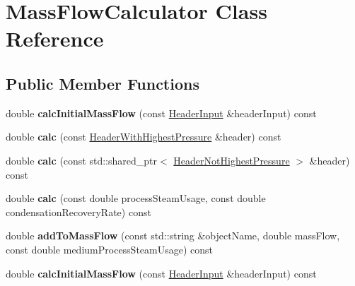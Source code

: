 \hypertarget{class_mass_flow_calculator}{}\section{Mass\+Flow\+Calculator Class Reference}
\label{class_mass_flow_calculator}
\subsection*{Public Member Functions}
\begin{DoxyCompactItemize}
\item 
\mbox{\label{class_mass_flow_calculator_adb4bbfd8c503a653bf1950d5697574a4}} 
double {\bfseries calc\+Initial\+Mass\+Flow} (const \hyperlink{class_header_input}{Header\+Input} \&header\+Input) const
\item 
\mbox{\label{class_mass_flow_calculator_a7213009c1ffc498b7dbac1d429cd6a93}} 
double {\bfseries calc} (const \hyperlink{class_header_with_highest_pressure}{Header\+With\+Highest\+Pressure} \&header) const
\item 
\mbox{\label{class_mass_flow_calculator_a2a3012c8c1d2ed53cdb38cd4a20b622d}} 
double {\bfseries calc} (const std\+::shared\+\_\+ptr$<$ \hyperlink{class_header_not_highest_pressure}{Header\+Not\+Highest\+Pressure} $>$ \&header) const
\item 
\mbox{\label{class_mass_flow_calculator_a5130b0192b5f041d1abe2f6094196849}} 
double {\bfseries calc} (const double process\+Steam\+Usage, const double condensation\+Recovery\+Rate) const
\item 
\mbox{\label{class_mass_flow_calculator_a53d5e454ecd9c62bbe2c201528797ec4}} 
double {\bfseries add\+To\+Mass\+Flow} (const std\+::string \&object\+Name, double mass\+Flow, const double medium\+Process\+Steam\+Usage) const
\item 
\mbox{\label{class_mass_flow_calculator_adb4bbfd8c503a653bf1950d5697574a4}} 
double {\bfseries calc\+Initial\+Mass\+Flow} (const \hyperlink{class_header_input}{Header\+Input} \&header\+Input) const
\item 

\end{DoxyCompactItemize}
